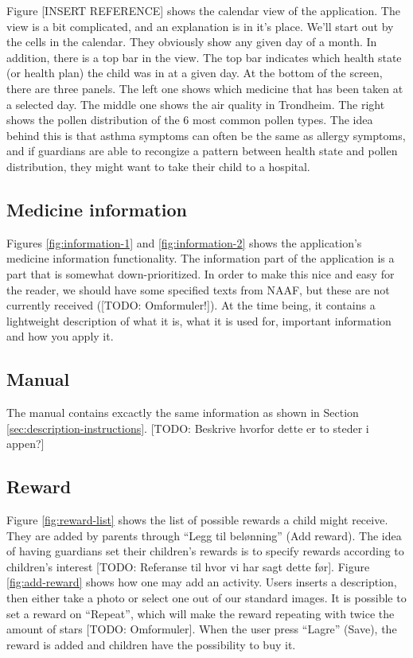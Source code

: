 Figure [INSERT REFERENCE] shows the calendar view of the application. The view is a bit complicated, and an explanation is in it's place. We'll start out by the cells in the calendar. They obviously show any given day of a month. In addition, there is a top bar in the view. The top bar indicates which health state (or health plan) the child was in at a given day. At the bottom of the screen, there are three panels. The left one shows which medicine that has been taken at a selected day. The middle one shows the air quality in Trondheim. The right shows the pollen distribution of the 6 most common pollen types. The idea behind this is that asthma symptoms can often be the same as allergy symptoms, and if guardians are able to recongize a pattern between health state and pollen distribution, they might want to take their child to a hospital.   
 
\subsection{Medicine information}
\label{sec:description-medicine-information}
Figures \ref{fig:information-1} and \ref{fig:information-2} shows the application's medicine information functionality. The information part of the application is a part that is somewhat down-prioritized. In order to make this nice and easy for the reader, we should have some specified texts from NAAF, but these are not currently received ([TODO: Omformuler!]). At the time being, it contains a lightweight description of what it is, what it is used for, important information and how you apply it. 


\subsection{Manual}
\label{sec:description-manual}
The manual contains excactly the same information as shown in Section \ref{sec:description-instructions}. [TODO: Beskrive hvorfor dette er to steder i appen?]


\subsection{Reward}
\label{sec:description-manage-rewards}
Figure \ref{fig:reward-list} shows the list of possible rewards a child might receive. They are added by parents through ``Legg til belønning'' (Add reward). The idea of having guardians set their children's rewards is to specify rewards according to children's interest [TODO: Referanse til hvor vi har sagt dette før]. Figure \ref{fig:add-reward} shows how one may add an activity. Users inserts a description, then either take a photo or select one out of our standard images. It is possible to set a reward on ``Repeat'', which will make the reward repeating with twice the amount of stars [TODO: Omformuler].        
When the user press ``Lagre'' (Save), the reward is added and children have the possibility to buy it. 
 

